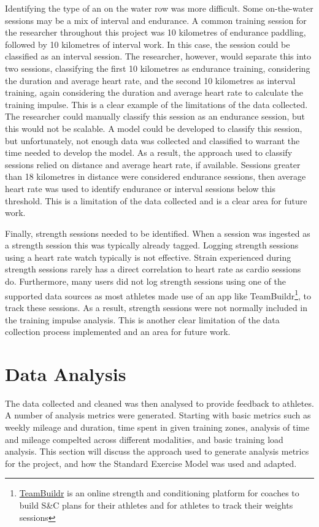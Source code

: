 Identifying the type of an on the water row was more difficult. Some on-the-water sessions may be a mix of interval and endurance. A common training session for the researcher throughout this project was 10 kilometres of endurance paddling, followed by 10 kilometres of interval work. In this case, the session could be classified as an interval session. The researcher, however, would separate this into two sessions, classifying the first 10 kilometres as endurance training, considering the duration and average heart rate, and the second 10 kilometres as interval training, again considering the duration and average heart rate to calculate the training impulse. This is a clear example of the limitations of the data collected. The researcher could manually classify this session as an endurance session, but this would not be scalable. A model could be developed to classify this session, but unfortunately, not enough data was collected and classified to warrant the time needed to develop the model. As a result, the approach used to classify sessions relied on distance and average heart rate, if available. Sessions greater than 18 kilometres in distance were considered endurance sessions, then average heart rate was used to identify endurance or interval sessions below this threshold. This is a limitation of the data collected and is a clear area for future work.

Finally, strength sessions needed to be identified. When a session was ingested as a strength session this was typically already tagged. Logging strength sessions using a heart rate watch typically is not effective. Strain experienced during strength sessions rarely has a direct correlation to heart rate as cardio sessions do. Furthermore, many users did not log strength sessions using one of the supported data sources as most athletes made use of an app like TeamBuildr\footnote{\href{https://www.teambuildr.com/}{TeamBuildr} is an online strength and conditioning platform for coaches to build S\&C plans for their athletes and for athletes to track their weights sessions}, to track these sessions. As a result, strength sessions were not normally included in the training impulse analysis.  This is another clear limitation of the data collection process implemented and an area for future work. 

\section{\label{sec:data-anyl}Data Analysis}
The data collected and cleaned was then analysed to provide feedback to athletes. A number of analysis metrics were generated. Starting with basic metrics such as weekly mileage and duration, time spent in given training zones, analysis of time and mileage compelted across different modalities, and basic training load analysis. This section will discuss the approach used to generate analysis metrics for the project, and how the Standard Exercise Model was used and adapted.


